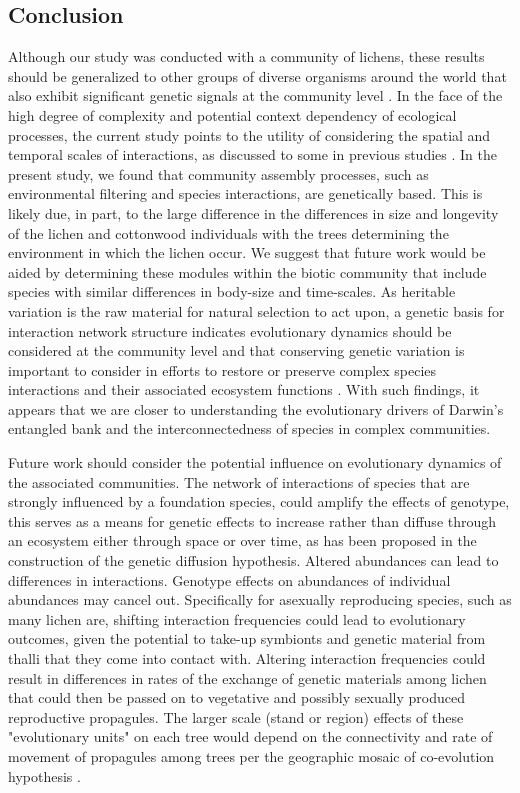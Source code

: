 \documentclass[11pt,twocolumn,twoside,lineno]{pnas-new}
\begin{document}
\subsection*{Conclusion}

Although our study was conducted with a community of lichens, these
results should be generalized to other groups of diverse organisms
around the world that also exhibit significant genetic signals at the
community level \cite{Rowntree2011, Whitham2012}. In the face of the
high degree of complexity and potential context dependency of
ecological processes, the current study points to the utility of
considering the spatial and temporal scales of interactions, as
discussed to some in previous studies \cite{Bangert2006, Zook2010,
  Zytynska2012}. In the present study, we found that community
assembly processes, such as environmental filtering and species
interactions, are genetically based. This is likely due, in part, to
the large difference in the differences in size and longevity of the
lichen and cottonwood individuals with the trees determining the
environment in which the lichen occur. We suggest that future work
would be aided by determining these modules within the biotic
community that include species with similar differences in body-size
and time-scales. As heritable variation is the raw material for
natural selection to act upon, a genetic basis for interaction network
structure indicates evolutionary dynamics should be considered at the
community level and that conserving genetic variation is important to
consider in efforts to restore or preserve complex species
interactions and their associated ecosystem functions
\cite{Evans2013}.  With such findings, it appears that we are closer
to understanding the evolutionary drivers of Darwin's entangled bank
and the interconnectedness of species in complex communities.


Future work should consider the potential influence on evolutionary
dynamics of the associated communities. The network of interactions of
species that are strongly influenced by a foundation species, could
amplify the effects of genotype, this serves as a means for genetic
effects to increase rather than diffuse through an ecosystem either
through space or over time, as has been proposed in the construction
of the genetic diffusion hypothesis. Altered abundances can lead to
differences in interactions. Genotype effects on abundances of
individual abundances may cancel out. Specifically for asexually
reproducing species, such as many lichen are, shifting interaction
frequencies could lead to evolutionary outcomes, given the potential
to take-up symbionts and genetic material from thalli that they come
into contact with. Altering interaction frequencies could result in
differences in rates of the exchange of genetic materials among lichen
that could then be passed on to vegetative and possibly sexually
produced reproductive propagules. The larger scale (stand or region)
effects of these "evolutionary units" on each tree would depend on the
connectivity and rate of movement of propagules among trees per the
geographic mosaic of co-evolution hypothesis \cite{Barbour2009c,
  Thompson2013}.
\end{document}
